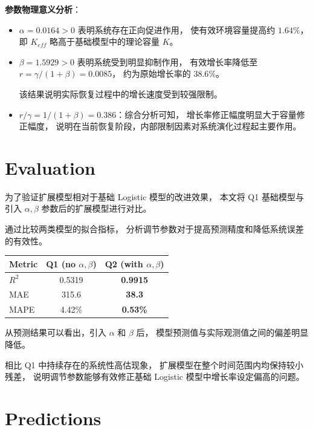 \documentclass[12pt,a4paper]{article}
\begin{document}
\textbf{参数物理意义分析}：
\begin{itemize}
  \item $\alpha=0.0164>0$ 表明系统存在正向促进作用，
使有效环境容量提高约 $1.64\%$，
即 $K_{eff}$ 略高于基础模型中的理论容量 $K$。
  \item $\beta=1.5929>0$ 表明系统受到明显抑制作用，
有效增长率降低至
$r=\gamma/(1+\beta)=0.0085$，
约为原始增长率的 $38.6\%$。

该结果说明实际恢复过程中的增长速度受到较强限制。
  \item $r/\gamma = 1/(1+\beta) = 0.386$：综合分析可知，
增长率修正幅度明显大于容量修正幅度，
说明在当前恢复阶段，内部限制因素对系统演化过程起主要作用。
\end{itemize}

\section{Evaluation}

为了验证扩展模型相对于基础 Logistic 模型的改进效果，
本文将 Q1 基础模型与引入 $\alpha,\beta$ 参数后的扩展模型进行对比。

通过比较两类模型的拟合指标，
分析调节参数对于提高预测精度和降低系统误差的有效性。

\begin{center}
\begin{tabular}{lcc}
\toprule
Metric & Q1 (no $\alpha,\beta$) & Q2 (with $\alpha,\beta$) \\
\midrule
$R^2$  & 0.5319 & \textbf{0.9915} \\
MAE    & 315.6  & \textbf{38.3} \\
MAPE   & 4.42\% & \textbf{0.53\%} \\
\bottomrule
\end{tabular}
\end{center}

从预测结果可以看出，引入 $\alpha$ 和 $\beta$ 后，
模型预测值与实际观测值之间的偏差明显降低。

相比 Q1 中持续存在的系统性高估现象，
扩展模型在整个时间范围内均保持较小残差，
说明调节参数能够有效修正基础 Logistic 模型中增长率设定偏高的问题。

\section{Predictions}
\end{document}
